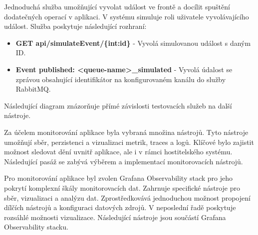 
Jednoduchá služba umožňující vyvolat událost ve frontě a docílit spuštění dodatečných operací v aplikaci. V systému simuluje roli uživatele vyvolávajícího událost. Služba poskytuje následující rozhraní:

\begin{itemize}
    \item \textbf{GET api/simulateEvent/\{int:id\}} - Vyvolá simulovanou událost s daným ID.
    \item \textbf{Event published: <queue-name>\_simulated} - Vyvolá údalost se zprávou obsahující identifikátor na konfigurovaném kanálu do služby RabbitMQ.
\end{itemize}

Následující diagram znázorňuje přímé závislosti testovacích služeb na další nástroje.



Za účelem monitorování aplikace byla vybraná množina nástrojů. Tyto nástroje umožňují sběr, perzistenci a vizualizaci metrik, traces a logů. Klíčové bylo zajistit možnost sledovat dění uvnitř aplikace, ale i v rámci hostitelského systému. Následující pasáž se zabývá výběrem a implementací monitorovacích nástrojů.


Pro monitorování aplikace byl zvolen Grafana Observability stack pro jeho pokrytí komplexní škály monitorovacích dat. Zahrnuje specifické nástroje pro sběr, vizualizaci a analýzu dat. Zprostředkovává jednoduchou možnost propojení dílčích nástrojů a konfiguraci datových zdrojů. V neposlední řadě poskytuje rozsáhlé možnosti vizualizace. Následující nástroje jsou součástí Grafana Observability stacku.

